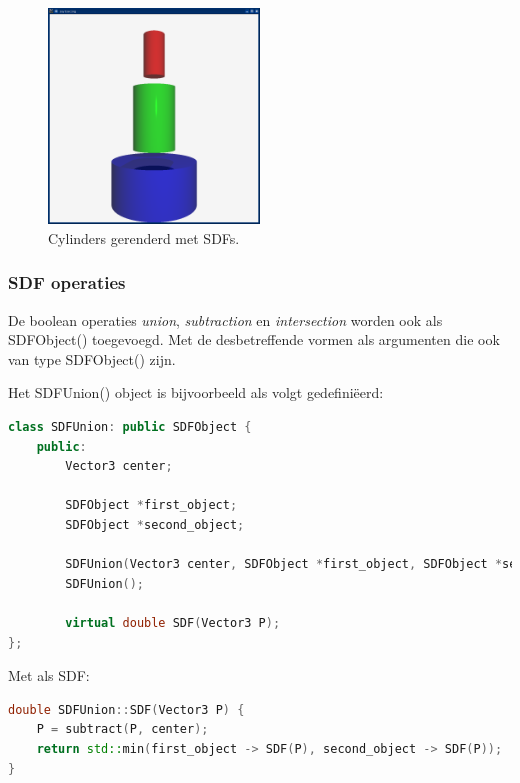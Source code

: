 \documentclass[12pt, a4paper]{article}
\begin{document}
\begin{figure}[H]
    \centering
    \includegraphics[width=0.50\textwidth]{renders/cylinders.png}
    \caption{Cylinders gerenderd met SDFs.}
    \label{fig:cylinders}
\end{figure}


\subsubsection{SDF operaties}

De boolean operaties \emph{union}, \emph{subtraction} en \emph{intersection} worden ook als SDFObject() toegevoegd. Met de desbetreffende vormen als argumenten die ook van type SDFObject() zijn.

Het SDFUnion() object is bijvoorbeeld als volgt gedefiniëerd:

\begin{lstlisting}[language=C++]
class SDFUnion: public SDFObject {
    public:
        Vector3 center;
        
        SDFObject *first_object;
        SDFObject *second_object;

        SDFUnion(Vector3 center, SDFObject *first_object, SDFObject *second_object, ObjectMaterial material);
        SDFUnion();

        virtual double SDF(Vector3 P);
};
\end{lstlisting}

Met als SDF:

\begin{lstlisting}[language=C++]
double SDFUnion::SDF(Vector3 P) {
    P = subtract(P, center);
    return std::min(first_object -> SDF(P), second_object -> SDF(P));
}
\end{lstlisting}
\end{document}
